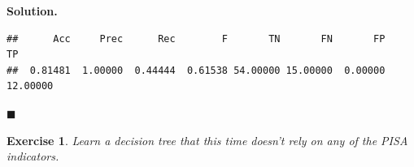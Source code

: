 \documentclass[10pt,b5paper,krantz1]{krantz}
\newenvironment{Shaded}{\begin{snugshade}}{\end{snugshade}}
\newcommand{\DataTypeTok}[1]{\textcolor[rgb]{0.27,0.27,0.27}{#1}}
\newcommand{\KeywordTok}[1]{\textcolor[rgb]{0.27,0.27,0.27}{\textbf{#1}}}
\newcommand{\NormalTok}[1]{#1}
\newcommand{\OperatorTok}[1]{\textcolor[rgb]{0.43,0.43,0.43}{\textbf{#1}}}
\newcommand{\StringTok}[1]{\textcolor[rgb]{0.5,0.5,0.5}{#1}}
\newtheorem{exercise}{Exercise}[chapter]
\newenvironment{solution}{%
\bigskip\noindent\textbf{Solution. }%
\it\ignorespaces%
\ignorespaces%
}{\ignorespaces%
\hfill$\blacksquare$%
}
\begin{document}
\begin{solution}
\begin{Shaded}
\end{Shaded}

\begin{verbatim}
##      Acc     Prec      Rec        F       TN       FN       FP       TP 
##  0.81481  1.00000  0.44444  0.61538 54.00000 15.00000  0.00000 12.00000
\end{verbatim}

\end{solution}

\begin{exercise}

Learn a decision tree that this time doesn't rely on any of the PISA indicators.

\end{exercise}
\end{document}
